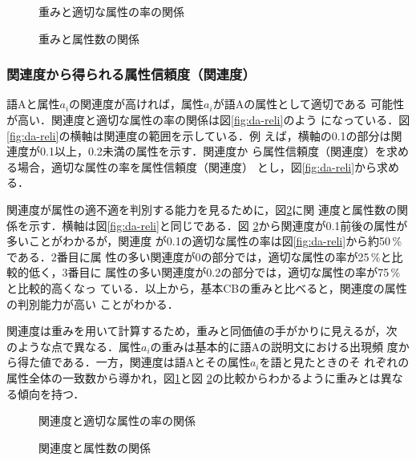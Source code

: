 \begin{figure}[ht]
  \begin{minipage}{.48\linewidth}
    \begin{center}
      \caption{重みと適切な属性の率の関係}
      \label{fig:wei-reli}
    \end{center}
  \end{minipage}
  \begin{minipage}{.48\linewidth}
    \begin{center}
      \caption{重みと属性数の関係}
      \label{fig:wei-num}
    \end{center}
  \end{minipage}
\end{figure}

\subsubsection{関連度から得られる属性信頼度（関連度）}

語Aと属性$a_i$の関連度が高ければ，属性$a_i$が語Aの属性として適切である
可能性が高い．関連度と適切な属性の率の関係は図\ref{fig:da-reli}のよう
になっている．図\ref{fig:da-reli}の横軸は関連度の範囲を示している．例
えば，横軸の0.1の部分は関連度が0.1以上，0.2未満の属性を示す．関連度か
ら属性信頼度（関連度）を求める場合，適切な属性の率を属性信頼度（関連度）
とし，図\ref{fig:da-reli}から求める．

関連度が属性の適不適を判別する能力を見るために，図\ref{fig:da-num}に関
連度と属性数の関係を示す．横軸は図\ref{fig:da-reli}と同じである．図
\ref{fig:da-num}から関連度が0.1前後の属性が多いことがわかるが，関連度
が0.1の適切な属性の率は図\ref{fig:da-reli}から約50\,\%である．2番目に属
性の多い関連度が0の部分では，適切な属性の率が25\,\%と比較的低く，3番目に
属性の多い関連度が0.2の部分では，適切な属性の率が75\,\%と比較的高くなっ
ている．以上から，基本CBの重みと比べると，関連度の属性の判別能力が高い
ことがわかる．

関連度は重みを用いて計算するため，重みと同価値の手がかりに見えるが，次
のような点で異なる．属性$a_i$の重みは基本的に語Aの説明文における出現頻
度から得た値である．一方，関連度は語Aとその属性$a_i$を語と見たときのそ
れぞれの属性全体の一致数から導かれ，図\ref{fig:wei-num}と図
\ref{fig:da-num}の比較からわかるように重みとは異なる傾向を持つ．

\begin{figure}[ht]
  \begin{minipage}{.48\linewidth}
    \begin{center}
      \caption{関連度と適切な属性の率の関係}
      \label{fig:da-reli}
    \end{center}
  \end{minipage}
  \begin{minipage}{.48\linewidth}
    \begin{center}
      \caption{関連度と属性数の関係}
      \label{fig:da-num}
    \end{center}
  \end{minipage}
\end{figure}

